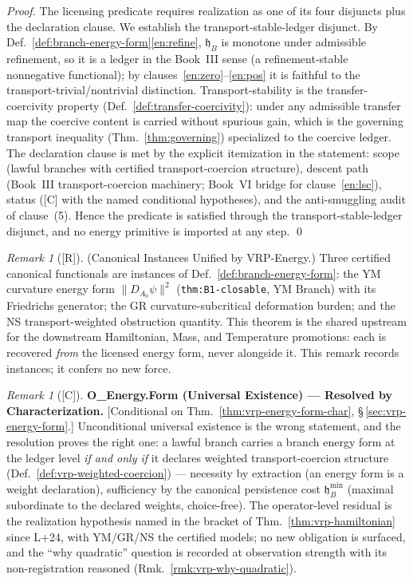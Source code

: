 \documentclass[12pt,oneside]{amsbook}
\theoremstyle{plain}
\theoremstyle{definition}
\theoremstyle{remark}
\newtheorem{remark}[theorem]{Remark}
\newcommand{\status}[1]{\textup{[#1]}}
\begin{document}
\begin{proof}
The licensing predicate requires realization as one of its four
disjuncts plus the declaration clause.  We establish the
transport-stable-ledger disjunct.  By
Def.~\ref{def:branch-energy-form}\ref{en:refine},
$\mathfrak{h}_B$ is monotone under admissible refinement, so it is
a ledger in the Book~III sense (a refinement-stable nonnegative
functional); by clauses~\ref{en:zero}--\ref{en:pos} it is
faithful to the transport-trivial/nontrivial distinction.
Transport-stability is the transfer-coercivity property
(Def.~\ref{def:transfer-coercivity}): under any admissible transfer
map the coercive content is carried without spurious gain, which is
the governing transport inequality (Thm.~\ref{thm:governing})
specialized to the coercive ledger.  The declaration clause is met
by the explicit itemization in the statement: scope (lawful
branches with certified transport-coercion structure), descent
path (Book~III transport-coercion machinery; Book~VI bridge for
clause~\ref{en:lsc}), status ([C] with the named conditional
hypotheses), and the anti-smuggling audit of clause~(5).  Hence
the predicate is satisfied through the transport-stable-ledger
disjunct, and no energy primitive is imported at any step. \qed
\end{proof}

\begin{remark}[\status{R}]\label{rmk:vrp-energy-instances}
\textup{(Canonical Instances Unified by VRP-Energy.)}
Three certified canonical functionals are instances of
Def.~\ref{def:branch-energy-form}: the YM curvature energy form
$\|D_{A_0}\psi\|^2$ (\texttt{thm:B1-closable}, YM Branch) with its
Friedrichs generator; the GR curvature-subcritical deformation
burden; and the NS transport-weighted obstruction quantity.  This
theorem is the shared upstream for the downstream Hamiltonian,
Mass, and Temperature promotions: each is recovered \emph{from}
the licensed energy form, never alongside it.  This remark records
instances; it confers no new force.
\end{remark}

\begin{remark}[\status{C}]\label{ob:vrp-energy-form}
\textbf{O\_Energy.Form (Universal Existence) --- Resolved by
Characterization.}
\textup{[Conditional on Thm.~\ref{thm:vrp-energy-form-char},
\S\,\ref{sec:vrp-energy-form}.]}
Unconditional universal existence is the wrong statement, and the
resolution proves the right one: a lawful branch carries a branch
energy form at the ledger level \emph{if and only if} it declares
weighted transport-coercion structure
(Def.~\ref{def:vrp-weighted-coercion}) --- necessity by
extraction (an energy form is a weight declaration), sufficiency
by the canonical persistence cost
$\mathfrak{h}_B^{\min}$ (maximal subordinate to the declared
weights, choice-free).  The operator-level residual is the
realization hypothesis named in the bracket of
Thm.~\ref{thm:vrp-hamiltonian} since L+24, with YM/GR/NS the
certified models; no new obligation is surfaced, and the
``why quadratic'' question is recorded at observation strength
with its non-registration reasoned
(Rmk.~\ref{rmk:vrp-why-quadratic}).
\end{remark}
\end{document}

